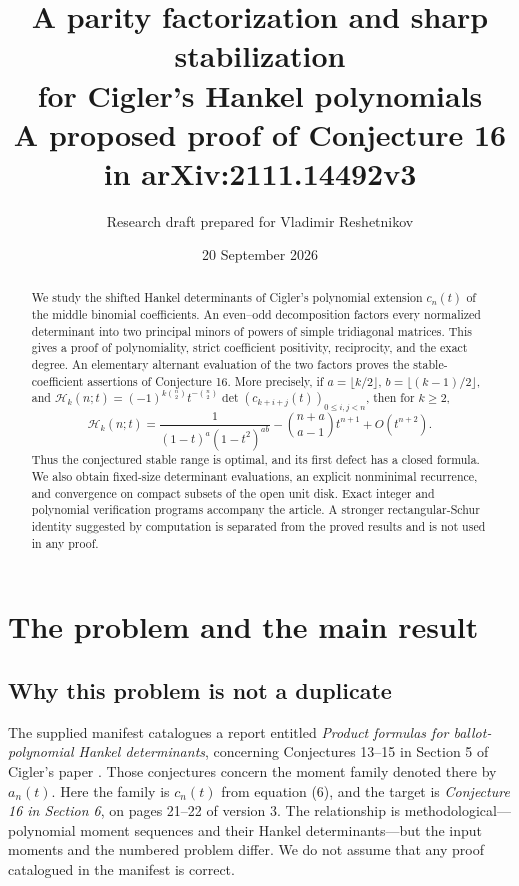 \documentclass[11pt]{article}
\title{\color{Ink}\LARGE A parity factorization and sharp stabilization\\[0.25em]
for Cigler's Hankel polynomials\\[0.5em]
\large A proposed proof of Conjecture 16 in arXiv:2111.14492v3}
\author{Research draft prepared for Vladimir Reshetnikov}
\date{20 September 2026}
\theoremstyle{definition}
\theoremstyle{remark}
\newcommand{\Ht}{\mathcal H}
\numberwithin{equation}{section}
\begin{document}
\maketitle
\thispagestyle{empty}
\begin{abstract}
We study the shifted Hankel determinants of Cigler's polynomial extension
$c_n(t)$ of the middle binomial coefficients. An even--odd decomposition
factors every normalized determinant into two principal minors of powers of
simple tridiagonal matrices. This gives a proof of polynomiality, strict
coefficient positivity, reciprocity, and the exact degree. An elementary
alternant evaluation of the two factors proves the stable-coefficient
assertions of Conjecture 16. More precisely, if
$a=\lfloor k/2\rfloor$, $b=\lfloor(k-1)/2\rfloor$, and
$\Ht_k(n;t)=(-1)^{k\binom n2}t^{-\binom n2}
\det(c_{k+i+j}(t))_{0\le i,j<n}$, then for $k\ge2$,
\[
\Ht_k(n;t)=\frac{1}{(1-t)^a(1-t^2)^{ab}}
-\binom{n+a}{a-1}t^{n+1}+O(t^{n+2}).
\]
Thus the conjectured stable range is optimal, and its first defect has a
closed formula. We also obtain fixed-size determinant evaluations, an
explicit nonminimal recurrence, and convergence on compact subsets of the
open unit disk. Exact integer and polynomial verification programs accompany
the article. A stronger rectangular-Schur identity suggested by computation
is separated from the proved results and is not used in any proof.
\end{abstract}

\medskip
\noindent{}

\clearpage
\tableofcontents
\clearpage

\section{The problem and the main result}
\label{sec:main}

\subsection{Why this problem is not a duplicate}
The supplied manifest \cite{manifest} catalogues a report entitled
\emph{Product formulas for ballot-polynomial Hankel determinants}, concerning
Conjectures 13--15 in Section 5 of Cigler's paper \cite{Cigler}.
Those conjectures concern the moment family denoted there by $a_n(t)$.
Here the family is $c_n(t)$ from equation (6), and the target is
\emph{Conjecture 16 in Section 6}, on pages 21--22 of version 3.
The relationship is methodological---polynomial moment sequences and their
Hankel determinants---but the input moments and the numbered problem differ.
We do not assume that any proof catalogued in the manifest is correct.
\end{document}
